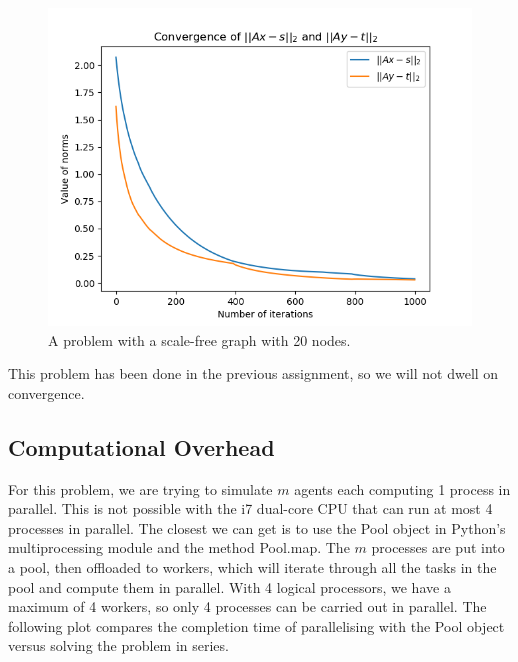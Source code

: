 \documentclass[12pt]{article}
\begin{document}
\begin{figure}[H]
	\centering
	\includegraphics[scale=0.91]{Problem3-Convergence.png}
	\caption{A problem with a scale-free graph with 20 nodes.}
\end{figure}

This problem has been done in the previous assignment, so we will not dwell on convergence.

\subsection*{Computational Overhead}

For this problem, we are trying to simulate $m$ agents each computing 1 process in parallel. This is not possible with the i7 dual-core CPU that can run at most 4 processes in parallel. The closest we can get is to use the Pool object in Python's multiprocessing module and the method Pool.map. The $m$ processes are put into a pool, then offloaded to workers, which will iterate through all the tasks in the pool and compute them in parallel. With 4 logical processors, we have a maximum of 4 workers, so only 4 processes can be carried out in parallel. The following plot compares the completion time of parallelising with the Pool object versus solving the problem in series.
\end{document}
